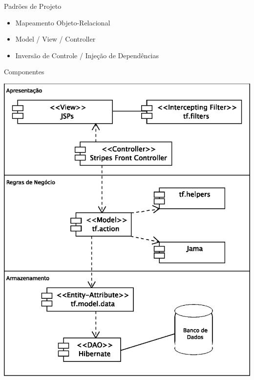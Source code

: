 \documentclass{beamer}
\begin{document}
\begin{frame}{Padrões de Projeto}
	\begin{itemize}
		\item Mapeamento Objeto-Relacional
		\item Model / View / Controller
		\item Inversão de Controle / Injeção de Dependências
	\end{itemize}
\end{frame}

\begin{frame}{Componentes}
\begin{center}
\includegraphics[scale=0.4]{../trabalho_full/deployment.eps}
\end{center}
\end{frame}
\end{document}

